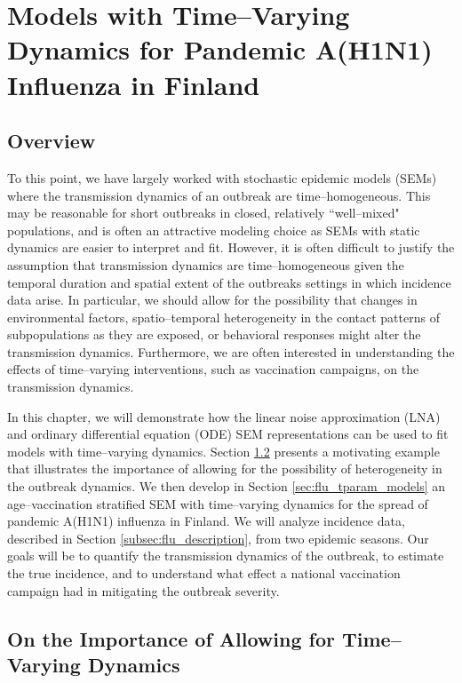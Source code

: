 \chapter{Models with Time--Varying Dynamics for Pandemic A(H1N1) Influenza in Finland}
\label{chap:lna_extensions}

\section{Overview}
\label{sec:lna_extensions_overview}
To this point, we have largely worked with stochastic epidemic models (SEMs) where the transmission dynamics of an outbreak are time--homogeneous. This may be reasonable for short outbreaks in closed, relatively ``well--mixed" populations, and is often an attractive modeling choice as SEMs with static dynamics are easier to interpret and fit. However, it is often difficult to justify the assumption that transmission dynamics are time--homogeneous given the temporal duration and spatial extent of the outbreaks settings in which incidence data arise. In particular, we should allow for the possibility that changes in environmental factors, spatio--temporal heterogeneity in the contact patterns of subpopulations as they are exposed, or behavioral responses might alter the transmission dynamics. Furthermore, we are often interested in understanding the effects of time--varying interventions, such as vaccination campaigns, on the transmission dynamics. 

In this chapter, we will demonstrate how the linear noise approximation (LNA) and ordinary differential equation (ODE) SEM representations can be used to fit models with time--varying dynamics. Section \ref{sec:tparam_motivation} presents a motivating example that illustrates the importance of allowing for the possibility of heterogeneity in the outbreak dynamics. We then develop in Section \ref{sec:flu_tparam_models} an age--vaccination stratified SEM with time--varying dynamics for the spread of pandemic A(H1N1) influenza in Finland. We will analyze incidence data, described in Section \ref{subsec:flu_description}, from two epidemic seasons. Our goals will be to quantify the transmission dynamics of the outbreak, to estimate the true incidence, and to understand what effect a national vaccination campaign had in mitigating the outbreak severity. 

\section{On the Importance of Allowing for Time--Varying Dynamics}
\label{sec:tparam_motivation}

